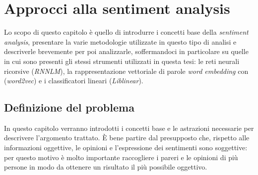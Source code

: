 \documentclass[a4paper,12pt,openright,twoside]{report}
\makeatletter
\theoremstyle{definition}
\def\cleardoublepage{\clearpage\if@twoside \ifodd\c@page\else
\hbox{}
\vspace*{\fill}
\begin{center}
\textit{}
\end{center}
\vspace{\fill}
\thispagestyle{empty}
\newpage
\if@twocolumn\hbox{}\newpage\fi\fi\fi}
\makeatother
\begin{document}
\clearpage{\pagestyle{empty}\cleardoublepage}
\tableofcontents                        %
\rhead[\fancyplain{}{\bfseries\leftmark}]{\fancyplain{}{\bfseries\thepage}}
\clearpage{\pagestyle{empty}\cleardoublepage}
\listoffigures                          %
\clearpage{\pagestyle{empty}\cleardoublepage}
\listoftables                           %

\lhead[\fancyplain{}{\bfseries\thepage}]{\fancyplain{}{\bfseries\rightmark}}


\chapter{Approcci alla sentiment analysis}

Lo scopo di questo capitolo è quello di introdurre i concetti base della \emph{sentiment analysis}, 
presentare la varie metodologie utilizzate in questo tipo di analisi e descriverle brevemente per poi 
analizzarle, soffermandoci in particolare su quelle in cui sono presenti gli stessi strumenti 
utilizzati in questa tesi: le reti neurali ricorsive (\emph{RNNLM}), 
la rappresentazione vettoriale di parole \emph{word embedding}
con (\emph{word2vec}) e 
i classificatori lineari (\emph{Liblinear}).

\section{Definizione del problema}
In questo capitolo verranno introdotti i concetti base e le astrazioni necessarie
per descrivere l'argomento trattato.
\`E bene partire dal presupposto che, rispetto alle informazioni oggettive, 
le opinioni e l'espressione dei sentimenti sono
soggettive: per questo motivo è molto importante raccogliere i pareri e le opinioni di più persone
in modo da ottenere un risultato il più possibile oggettivo.
\end{document}
